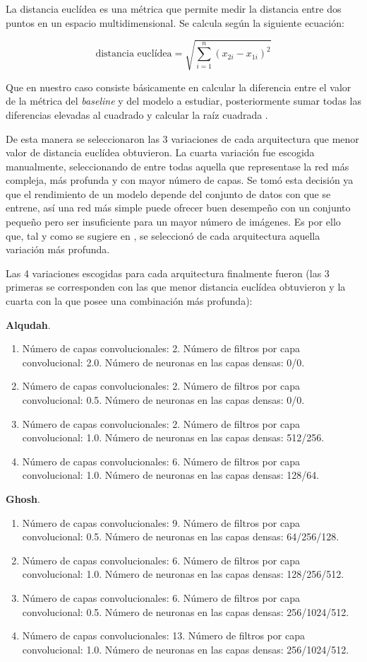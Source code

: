 La distancia euclídea es una métrica que permite medir la distancia entre dos puntos en un espacio multidimensional. Se calcula según la siguiente ecuación:

$$\text{distancia euclídea} = \sqrt{{\sum_{i=1}^{n} (x_{2i} - x_{1i})^2}}$$

Que en nuestro caso consiste básicamente en calcular la diferencia entre el valor de la métrica del \textit{baseline} y del modelo a estudiar, posteriormente sumar todas las diferencias elevadas al cuadrado y calcular la raíz cuadrada \cite{datasets:euclidea}.

De esta manera se seleccionaron las 3 variaciones de cada arquitectura que menor valor de distancia euclídea obtuvieron. La cuarta variación fue escogida manualmente, seleccionando de entre todas aquella que representase la red más compleja, más profunda y con mayor número de capas. Se tomó esta decisión ya que el rendimiento de un modelo depende del conjunto de datos con que se entrene, así una red más simple puede ofrecer buen desempeño con un conjunto pequeño pero ser insuficiente para un mayor número de imágenes. Es por ello que, tal y como se sugiere en \cite{datasets:very_deep, datasets:large_deep}, se seleccionó de cada arquitectura aquella variación más profunda.

Las 4 variaciones escogidas para cada arquitectura finalmente fueron (las 3 primeras se corresponden con las que menor distancia euclídea obtuvieron y la cuarta con la que posee una combinación más profunda):

\textbf{Alqudah}.
\begin{enumerate}
    \item Número de capas convolucionales: 2. Número de filtros por capa convolucional: 2.0. Número de neuronas en las capas densas: 0/0.
    \item Número de capas convolucionales: 2. Número de filtros por capa convolucional: 0.5. Número de neuronas en las capas densas: 0/0.
    \item Número de capas convolucionales: 2. Número de filtros por capa convolucional: 1.0. Número de neuronas en las capas densas: 512/256.
    \item Número de capas convolucionales: 6. Número de filtros por capa convolucional: 1.0. Número de neuronas en las capas densas: 128/64.
\end{enumerate}

\textbf{Ghosh}.
\begin{enumerate}
    \item Número de capas convolucionales: 9. Número de filtros por capa convolucional: 0.5. Número de neuronas en las capas densas: 64/256/128.
    \item Número de capas convolucionales: 6. Número de filtros por capa convolucional: 1.0. Número de neuronas en las capas densas: 128/256/512.
    \item Número de capas convolucionales: 6. Número de filtros por capa convolucional: 0.5. Número de neuronas en las capas densas: 256/1024/512.
    \item Número de capas convolucionales: 13. Número de filtros por capa convolucional: 1.0. Número de neuronas en las capas densas: 256/1024/512.
\end{enumerate}

